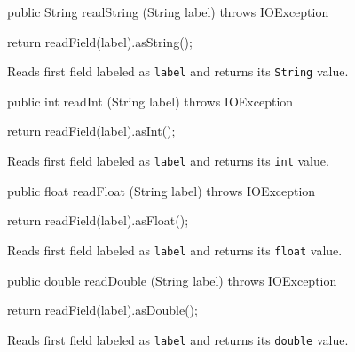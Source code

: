 \begin{code}

   public String readString (String label) throws IOException \begin{hide} {
      return readField(label).asString();
   }
   \end{hide}
\end{code}
\begin{tabb}
Reads first field labeled as \texttt{label} and returns its \texttt{String} value.
\end{tabb}
\begin{code}

   public int readInt (String label) throws IOException \begin{hide} {
      return readField(label).asInt();
   }
   \end{hide}
\end{code}
\begin{tabb}
Reads first field labeled as \texttt{label} and returns its \texttt{int} value.
\end{tabb}
\begin{code}
   
   public float readFloat (String label) throws IOException \begin{hide} {
      return readField(label).asFloat();
   }
   \end{hide}
\end{code}
\begin{tabb}
Reads first field labeled as \texttt{label} and returns its \texttt{float} value.
\end{tabb}
\begin{code}

   public double readDouble (String label) throws IOException \begin{hide} {
      return readField(label).asDouble();
   }
   \end{hide}
\end{code}
\begin{tabb}
Reads first field labeled as \texttt{label} and returns its \texttt{double} value.
\end{tabb}

